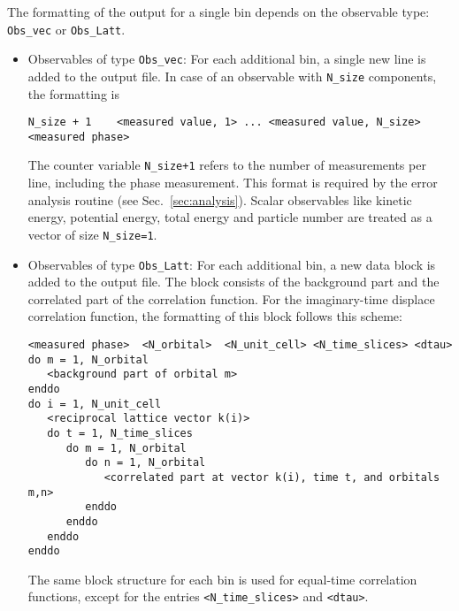 The formatting of the output for a single bin depends on the observable type: \texttt{Obs\_vec} or \texttt{Obs\_Latt}.
\begin{itemize}
\item Observables of type \texttt{Obs\_vec}:
For each additional bin, a single new line is added to the output file.
In case of an observable with \texttt{N\_size} components, the formatting is 
\begin{verbatim}
N_size + 1    <measured value, 1> ... <measured value, N_size>    <measured phase>
\end{verbatim}
The counter variable \texttt{N\_size+1} refers to the number of measurements per line, including the phase measurement. 
This format is required by the error analysis routine (see Sec.~\ref{sec:analysis}). 
Scalar observables like kinetic energy, potential energy, total energy and particle number are treated as a vector 
of size \texttt{N\_size=1}.

\item Observables of type \texttt{Obs\_Latt}:
For each additional bin, a new data block is added to the output file. 
The block consists of the background part and the correlated part of the correlation function.
For the imaginary-time displace correlation function, the formatting of this block follows this scheme:
\begin{verbatim}
<measured phase>  <N_orbital>  <N_unit_cell> <N_time_slices> <dtau>
do m = 1, N_orbital
   <background part of orbital m>
enddo
do i = 1, N_unit_cell
   <reciprocal lattice vector k(i)>
   do t = 1, N_time_slices
      do m = 1, N_orbital
         do n = 1, N_orbital
            <correlated part at vector k(i), time t, and orbitals m,n>
         enddo
      enddo
   enddo
enddo
\end{verbatim}
The same block structure for each bin is used for equal-time correlation functions, except for the entries  \texttt{<N\_time\_slices>} and \texttt{<dtau>}.

\end{itemize}

